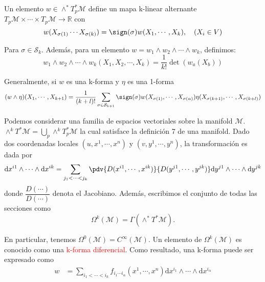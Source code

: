 \documentclass[../main]{subfiles}
\begin{document}
\begin{adjustwidth}{0pt}{-100pt}
Un elemento $w \in \wedge^* T^*_p \mathcal{M}$ define un mapa k-linear alternante $T_p \mathcal{M} \times \cdots \times T_p \mathcal{M} \rightarrow \mathbb{R}$ con 
\begin{equation}
    w(X_{\sigma(1)} \cdots X_{\sigma(k)})=\sign(\sigma) w(X_1, \cdots, X_k),\quad (X_i \in V)
\end{equation}

Para $\sigma \in \mathcal{S}_k$. Además, para un elemento $w=w_1\wedge w_2\wedge \cdots \wedge w_k$, definimos:
\begin{equation}
    w_1\wedge w_2\wedge \cdots \wedge w_k(X_1, X_2, \cdots, X_k)=\dfrac{1}{k!}\det(w_a(X_b))
\end{equation}

Generalmente, si $w$ es una k-forma y $\eta$ es una 1-forma 
\begin{equation}
    (w \wedge \eta)(X_1, \cdots, X_{k+1})=\dfrac{1}{(k+l)!}\sum_{\sigma \in \mathcal{S}_{k+1}} \sign(\sigma) w(X_{\sigma(1)}, \cdots, X_{\sigma(\alpha)})\eta(X_{\sigma(k+1)}, \cdots, X_{\sigma(k+l)})
\end{equation}

Podemos considerar una familia de espacios vectoriales sobre la manifold $\mathcal{M}$. $\wedge^k T^* \mathcal{M}=\bigcup_p \wedge^k T^*_p \mathcal{M}$ la cual satisface la definición 7 de una manifold.  Dado dos coordenadas locales $(u, x^1, \cdots, x^n)$ y $(v, y^1, \cdots, y^n)$, la transformación es dada por 
\begin{equation}
    \mathrm{d}x^{i1}\wedge \cdots \wedge \mathrm{d}x^{ik}=\sum_{j_1 < \cdots <j_k} \pdv{D(x^{i1}, \cdots, x^{ik})}{D(y^{j1}, \cdots, y^{jk})} \mathrm{d}y^{j1} \wedge \cdots \wedge \mathrm{d}y^{jk}
\end{equation}
donde $\displaystyle \dfrac{D(\cdots)}{D(\cdots)}$ denota el Jacobiano. Además, escribimos el conjunto de todas las secciones como 
\begin{equation}
    \Omega^k(\mathcal{M})=\Gamma(\wedge^* T^* \mathcal{M}).
\end{equation}

En particular, tenemos $\Omega^0(\mathcal{M})=C^{\infty}(\mathcal{M})$. Un elemento de $\Omega^k(\mathcal{M})$ es conocido como una \textcolor{red}{k-forma diferencial}. Como resultado, una k-forma puede ser expresado como 
\begin{equation}
    \begin{split}
        w&=\sum_{i_1<\cdots <i_k}f_{i_1\cdots i_{\alpha}}(x^1, \cdots, x^n)\mathrm{d}x^{i_1}\wedge \cdots \wedge \mathrm{d}x^{i_{\alpha}}
    \end{split}
\end{equation}


\end{adjustwidth}
\end{document}
